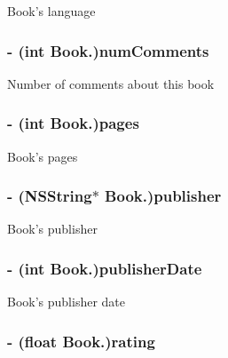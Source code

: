 \label{interface_book_a410185f5b9cba8002f29c7b90efc63fd}
Book's language \hypertarget{interface_book_a30fb1d5f55bbff0bb59069d8edac6fc5}{
\subsubsection[{numComments}]{\setlength{\rightskip}{0pt plus 5cm}-\/ (int Book.)numComments}}
\label{interface_book_a30fb1d5f55bbff0bb59069d8edac6fc5}
Number of comments about this book \hypertarget{interface_book_afce3f5159731bc21f6d4eca13f957c98}{
\subsubsection[{pages}]{\setlength{\rightskip}{0pt plus 5cm}-\/ (int Book.)pages}}
\label{interface_book_afce3f5159731bc21f6d4eca13f957c98}
Book's pages \hypertarget{interface_book_ab50b743487d36dbad67e0c27c2db6d95}{
\subsubsection[{publisher}]{\setlength{\rightskip}{0pt plus 5cm}-\/ (NSString$\ast$ Book.)publisher}}
\label{interface_book_ab50b743487d36dbad67e0c27c2db6d95}
Book's publisher \hypertarget{interface_book_a96ce18e68a2e534ef4d68b2c426d6440}{
\subsubsection[{publisherDate}]{\setlength{\rightskip}{0pt plus 5cm}-\/ (int Book.)publisherDate}}
\label{interface_book_a96ce18e68a2e534ef4d68b2c426d6440}
Book's publisher date \hypertarget{interface_book_a8afeec1f31606be6859a1db6d85c2692}{
\subsubsection[{rating}]{\setlength{\rightskip}{0pt plus 5cm}-\/ (float Book.)rating}}
